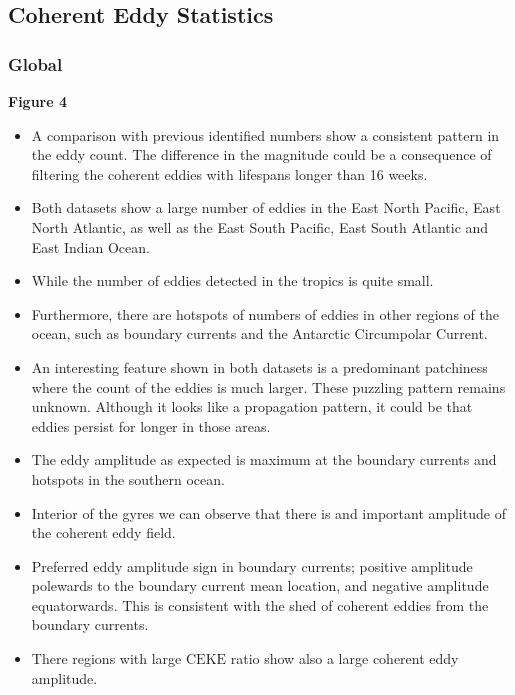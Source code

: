 \documentclass[draft,linenumbers]{agujournal2019}
\newcommand{\CEKE}{\textrm{CEKE}}
\begin{document}
	\subsection{Coherent Eddy Statistics}

	\subsubsection{Global}
	

	\textbf{Figure 4}
	\begin{itemize}
		\item A comparison with previous identified numbers show a consistent pattern in the eddy count. The difference in the magnitude could be a consequence of \citet{Chelton_Global_2007} filtering the coherent eddies with lifespans longer than 16 weeks. 
		\item Both datasets show a large number of eddies in the East North Pacific, East North Atlantic, as well as the East South Pacific, East South Atlantic and East Indian Ocean. 
		\item While the number of eddies detected in the tropics is quite small.
		\item Furthermore, there are hotspots of numbers of eddies in other regions of the ocean, such as boundary currents and the Antarctic Circumpolar Current. 
		\item An interesting feature shown in both datasets is a predominant patchiness where the count of the eddies is much larger. These puzzling pattern remains unknown. Although it looks like a propagation pattern, it could be that eddies persist for longer in those areas.
		\item The eddy amplitude as expected is maximum at the boundary currents and hotspots in the southern ocean.
		\item Interior of the gyres we can observe that there is and important amplitude of the coherent eddy field. 
		\item Preferred eddy amplitude sign in boundary currents; positive amplitude polewards to the boundary current mean location, and negative amplitude equatorwards. This is consistent with the shed of coherent eddies from the boundary currents.
		\item There regions with large $\CEKE$ ratio show also a large coherent eddy amplitude.
	\end{itemize}
\end{document}

